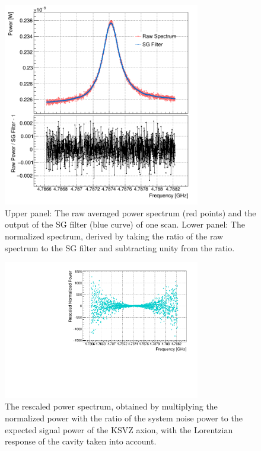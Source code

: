 \begin{figure} [htbp]
  \centering
  \includegraphics[width=8.6cm]{figures/RawPower_SGPower_Ratio_vs_Freq_Step_0100.png}
  \caption{Upper panel: The raw averaged power spectrum (red points) and the 
output of 
the SG filter (blue curve) of one scan. Lower panel: The normalized 
spectrum,  derived by taking the ratio of the raw spectrum to the SG filter 
and subtracting unity from the ratio. }
  \label{fig:raw_sg_power}
\end{figure}

\begin{figure} [htbp]
  \centering
  \includegraphics[width=8.6cm]{figures/RescaledPower_vs_Freq_Step_0100.pdf}
  \caption{
  The rescaled power spectrum, obtained by multiplying the normalized 
power with the ratio of the system noise power to the expected signal power of 
the KSVZ axion, 
with the Lorentzian response of the cavity taken into account.}
  \label{fig:rescaled_power}
\end{figure}





